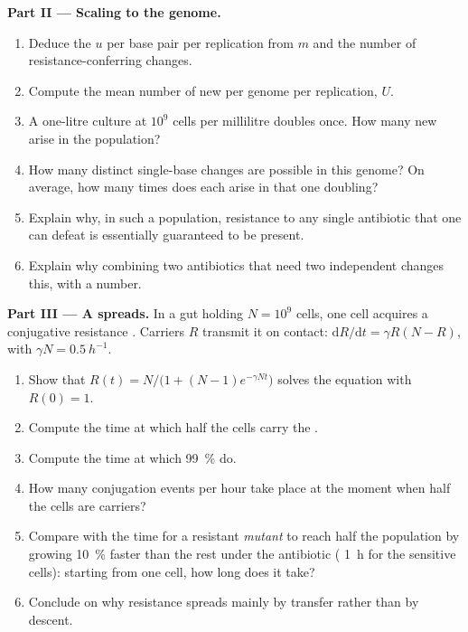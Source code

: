 \begin{problem}
\medskip
\noindent\textbf{Part II --- Scaling to the genome.}
\begin{enumerate}[resume]
  \item Deduce the  $u$ per base pair per replication
        from $m$ and the number of resistance-conferring changes.
  \item Compute the mean number of new  per genome per
        replication, $U$.
  \item A one-litre culture at $10^{9}$ cells per millilitre doubles
        once. How many new  arise in the population?
  \item How many distinct single-base changes are possible in this
        genome? On average, how many times does each arise in that
        one doubling?
  \item Explain why, in such a population, resistance to any single
        antibiotic that one  can defeat is essentially
        guaranteed to be present.
  \item Explain why combining two antibiotics that need two
        independent  changes this, with a number.
\end{enumerate}

\medskip
\noindent\textbf{Part III --- A  spreads.}
In a gut holding $N = 10^{9}$ cells, one cell acquires a conjugative
resistance . Carriers $R$ transmit it on contact:
$\mathrm{d}R/\mathrm{d}t = \gamma R(N - R)$, with $\gamma N =
\qty{0.5}{h^{-1}}$.
\begin{enumerate}[resume]
  \item Show that $R(t) = N/\bigl(1 + (N - 1)e^{-\gamma N t}\bigr)$
        solves the equation with $R(0) = 1$.
  \item Compute the time at which half the cells carry the .
  \item Compute the time at which \qty{99}{\%} do.
  \item How many conjugation events per hour take place at the moment
        when half the cells are carriers?
  \item Compare with the time for a resistant \emph{mutant} to reach
        half the population by growing \qty{10}{\%} faster than the
        rest under the antibiotic ( \qty{1}{h} for the
        sensitive cells): starting from one cell, how long does it
        take?
  \item Conclude on why resistance spreads mainly by transfer rather
        than by descent.
\end{enumerate}


\end{problem}
